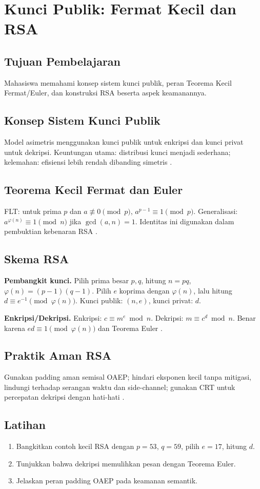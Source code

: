 \documentclass[../main.tex]{subfiles}
\begin{document}
\chapter{Kunci Publik: Fermat Kecil dan RSA}

\section{Tujuan Pembelajaran}
Mahasiswa memahami konsep sistem kunci publik, peran Teorema Kecil Fermat/Euler, dan konstruksi RSA beserta aspek keamanannya.

\section{Konsep Sistem Kunci Publik}
Model asimetris menggunakan kunci publik untuk enkripsi dan kunci privat untuk dekripsi. Keuntungan utama: distribusi kunci menjadi sederhana; kelemahan: efisiensi lebih rendah dibanding simetris \citep{katzlindell}.

\section{Teorema Kecil Fermat dan Euler}
FLT: untuk prima \(p\) dan \(a\not\equiv 0\pmod p\), \(a^{p-1}\equiv 1\pmod p\). Generalisasi: \(a^{\varphi(n)}\equiv 1\pmod n\) jika \(\gcd(a,n)=1\). Identitas ini digunakan dalam pembuktian kebenaran RSA \citep{hoffstein,rosen}.

\section{Skema RSA}
\textbf{Pembangkit kunci.} Pilih prima besar \(p,q\), hitung \(n=pq\), \(\varphi(n)=(p-1)(q-1)\). Pilih \(e\) koprima dengan \(\varphi(n)\), lalu hitung \(d\equiv e^{-1}\pmod{\varphi(n)}\). Kunci publik: \((n,e)\), kunci privat: \(d\).

\textbf{Enkripsi/Dekripsi.} Enkripsi: \(c\equiv m^e\bmod n\). Dekripsi: \(m\equiv c^d\bmod n\). Benar karena \(ed\equiv 1\pmod{\varphi(n)}\) dan Teorema Euler \citep{rsa}.

\section{Praktik Aman RSA}
Gunakan padding aman semisal OAEP; hindari eksponen kecil tanpa mitigasi, lindungi terhadap serangan waktu dan side-channel; gunakan CRT untuk percepatan dekripsi dengan hati-hati \citep{katzlindell,menezes}.

\section{Latihan}
\begin{enumerate}
  \item Bangkitkan contoh kecil RSA dengan \(p=53\), \(q=59\), pilih \(e=17\), hitung \(d\).
  \item Tunjukkan bahwa dekripsi memulihkan pesan dengan Teorema Euler.
  \item Jelaskan peran padding OAEP pada keamanan semantik.
\end{enumerate}
\end{document}

